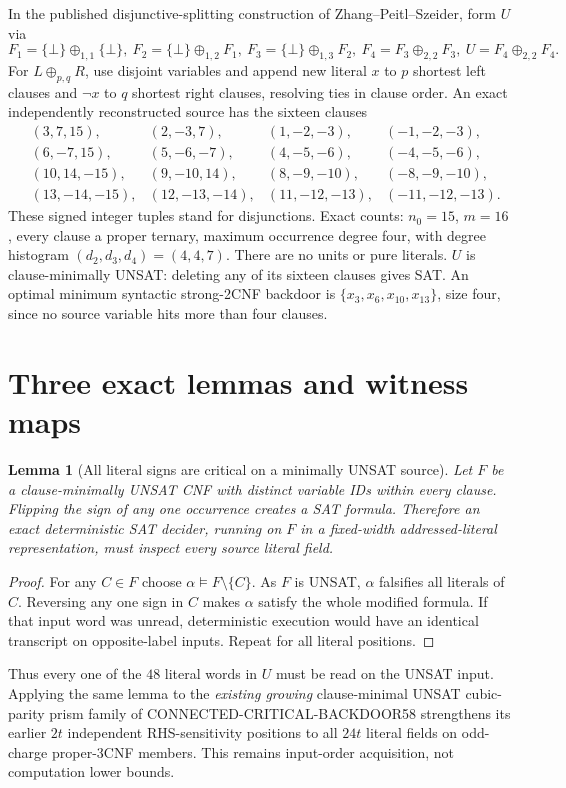 \documentclass[11pt]{article}
\newtheorem{lemma}{Lemma}
\begin{document}
In the published disjunctive-splitting construction of Zhang--Peitl--Szeider, form $U$ via
\[
F_1=\{\bot\}\oplus_{1,1}\{\bot\},\
F_2=\{\bot\}\oplus_{1,2}F_1,\
F_3=\{\bot\}\oplus_{1,3}F_2,\
F_4=F_3\oplus_{2,2}F_3,\
U=F_4\oplus_{2,2}F_4.
\]
For $L\oplus_{p,q}R$, use disjoint variables and append new literal $x$ to $p$ shortest left clauses and $\neg x$ to $q$ shortest right clauses, resolving ties in clause order. An exact independently reconstructed source has the sixteen clauses
\begin{align*}
 &(3,7,15),&(2,-3,7),&(1,-2,-3),&(-1,-2,-3),\\
 &(6,-7,15),&(5,-6,-7),&(4,-5,-6),&(-4,-5,-6),\\
 &(10,14,-15),&(9,-10,14),&(8,-9,-10),&(-8,-9,-10),\\
 &(13,-14,-15),&(12,-13,-14),&(11,-12,-13),&(-11,-12,-13).
\end{align*}
These signed integer tuples stand for disjunctions. Exact counts: $n_0=15$, $m=16$, every clause a proper ternary, maximum occurrence degree four, with degree histogram $(d_2,d_3,d_4)=(4,4,7)$. There are no units or pure literals. $U$ is clause-minimally UNSAT: deleting any of its sixteen clauses gives SAT. An optimal minimum syntactic strong-2CNF backdoor is $\{x_3,x_6,x_{10},x_{13}\}$, size four, since no source variable hits more than four clauses.

\section{Three exact lemmas and witness maps}
\begin{lemma}[All literal signs are critical on a minimally UNSAT source]
Let $F$ be a clause-minimally UNSAT CNF with distinct variable IDs within every clause. Flipping the sign of any one occurrence creates a SAT formula. Therefore an exact deterministic SAT decider, running on $F$ in a fixed-width addressed-literal representation, must inspect every source literal field.
\end{lemma}
\begin{proof}
For any $C\in F$ choose $\alpha\models F\setminus\{C\}$. As $F$ is UNSAT, $\alpha$ falsifies all literals of $C$. Reversing any one sign in $C$ makes $\alpha$ satisfy the whole modified formula. If that input word was unread, deterministic execution would have an identical transcript on opposite-label inputs. Repeat for all literal positions.
\end{proof}
Thus every one of the $48$ literal words in $U$ must be read on the UNSAT input. Applying the same lemma to the \emph{existing growing} clause-minimal UNSAT cubic-parity prism family of CONNECTED-CRITICAL-BACKDOOR58 strengthens its earlier $2t$ independent RHS-sensitivity positions to all $24t$ literal fields on odd-charge proper-3CNF members. This remains input-order acquisition, not computation lower bounds.
\end{document}
